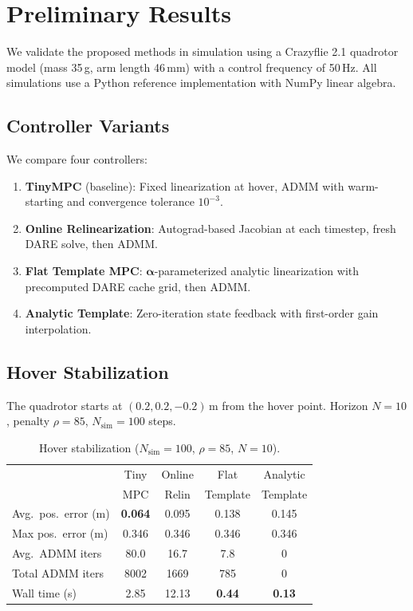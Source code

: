 \documentclass[letterpaper, 10pt, conference]{IEEEtran}
\newcommand{\balpha}{\bm{\alpha}}
\begin{document}
\section{Preliminary Results}\label{sec:experiments}

We validate the proposed methods in simulation using
a Crazyflie 2.1 quadrotor model (mass 35\,g, arm length 46\,mm)
with a control frequency of 50\,Hz.
All simulations use a Python reference implementation
with NumPy linear algebra.

\subsection{Controller Variants}

We compare four controllers:
\begin{enumerate}
  \item \textbf{TinyMPC} (baseline): Fixed linearization at hover,
    ADMM with warm-starting and convergence tolerance $10^{-3}$.
  \item \textbf{Online Relinearization}: Autograd-based Jacobian
    at each timestep, fresh DARE solve, then ADMM.
  \item \textbf{Flat Template MPC}: $\balpha$-parameterized analytic
    linearization with precomputed DARE cache grid, then ADMM.
  \item \textbf{Analytic Template}: Zero-iteration state feedback
    with first-order gain interpolation.
\end{enumerate}

\subsection{Hover Stabilization}

The quadrotor starts at $(0.2, 0.2, -0.2)$\,m from the hover point.
Horizon $N=10$, penalty $\rho = 85$, $N_{\mathrm{sim}} = 100$ steps.

\begin{table}[t]
\centering
\caption{Hover stabilization ($N_{\mathrm{sim}}=100$, $\rho=85$, $N=10$).}
\label{tab:hover}
\begin{tabular}{@{}lcccc@{}}
\toprule
 & Tiny & Online & Flat & Analytic \\
 & MPC & Relin & Template & Template \\
\midrule
Avg.\ pos.\ error (m)  & \textbf{0.064} & 0.095 & 0.138 & 0.145 \\
Max pos.\ error (m)    & 0.346 & 0.346 & 0.346 & 0.346 \\
Avg.\ ADMM iters       & 80.0 & 16.7 & 7.8 & 0 \\
Total ADMM iters       & 8002 & 1669 & 785 & 0 \\
Wall time (s)          & 2.85 & 12.13 & \textbf{0.44} & \textbf{0.13} \\
\bottomrule
\end{tabular}
\end{table}
\end{document}
